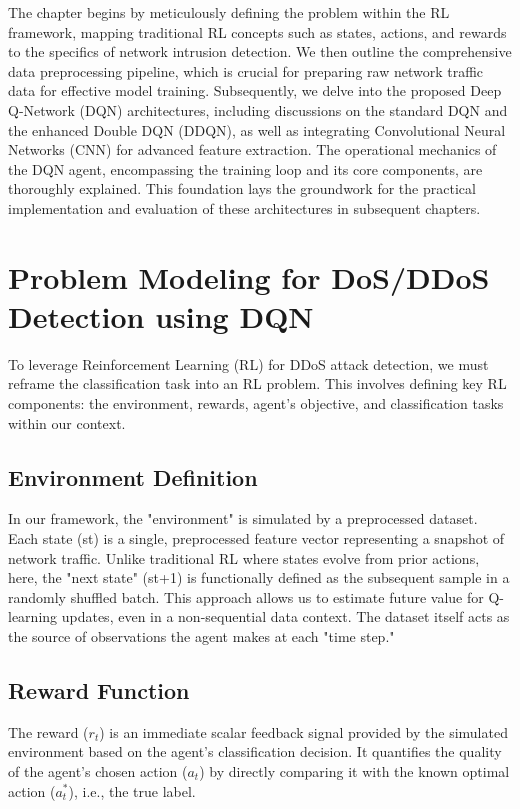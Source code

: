 \documentclass[12pt]{report}
\begin{document}
The chapter begins by meticulously defining the problem within the RL framework, mapping traditional RL concepts such as states, actions, and rewards to the specifics of network intrusion detection. We then outline the comprehensive data preprocessing pipeline, which is crucial for preparing raw network traffic data for effective model training. Subsequently, we delve into the proposed Deep Q-Network (DQN) architectures, including discussions on the standard DQN and the enhanced Double DQN (DDQN), as well as integrating Convolutional Neural Networks (CNN) for advanced feature extraction. The operational mechanics of the DQN agent, encompassing the training loop and its core components, are thoroughly explained. This foundation lays the groundwork for the practical implementation and evaluation of these architectures in subsequent chapters.

\section{Problem Modeling for DoS/DDoS Detection using DQN}

To leverage Reinforcement Learning (RL) for DDoS attack detection, we must reframe the classification task into an RL problem. This involves defining key RL components: the environment, rewards, agent's objective, and classification tasks within our context.

\subsection{Environment Definition}
In our framework, the "environment" is simulated by a preprocessed dataset. Each state (st​) is a single, preprocessed feature vector representing a snapshot of network traffic. Unlike traditional RL where states evolve from prior actions, here, the "next state" (st+1​) is functionally defined as the subsequent sample in a randomly shuffled batch. This approach allows us to estimate future value for Q-learning updates, even in a non-sequential data context. The dataset itself acts as the source of observations the agent makes at each "time step."

\subsection{Reward Function}

The reward ($r_t$) is an immediate scalar feedback signal provided by the simulated environment based on the agent's classification decision. It quantifies the quality of the agent’s chosen action ($a_t$) by directly comparing it with the known optimal action ($a_t^*$), i.e., the true label.
\end{document}
